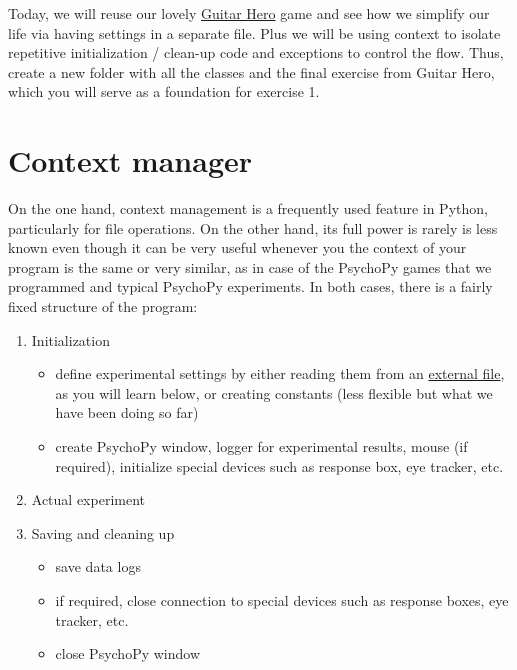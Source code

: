 \documentclass[
]{book}
\providecommand{\tightlist}{%
  \setlength{\itemsep}{0pt}\setlength{\parskip}{0pt}}
\begin{document}
Today, we will reuse our lovely \protect\hyperlink{seminar-02-06}{Guitar Hero} game and see how we simplify our life via having settings in a separate file. Plus we will be using context to isolate repetitive initialization / clean-up code and exceptions to control the flow. Thus, create a new folder with all the classes and the final exercise from Guitar Hero, which you will serve as a foundation for exercise 1.

\hypertarget{context-manager}{%
\section{Context manager}\label{context-manager}}

On the one hand, context management is a frequently used feature in Python, particularly for file operations. On the other hand, its full power is rarely is less known even though it can be very useful whenever you the context of your program is the same or very similar, as in case of the PsychoPy games that we programmed and typical PsychoPy experiments. In both cases, there is a fairly fixed structure of the program:

\begin{enumerate}
\def\labelenumi{\arabic{enumi}.}
\tightlist
\item
  Initialization

  \begin{itemize}
  \tightlist
  \item
    define experimental settings by either reading them from an \protect\hyperlink{settings-files}{external file}, as you will learn below, or creating constants (less flexible but what we have been doing so far)
  \item
    create PsychoPy window, logger for experimental results, mouse (if required), initialize special devices such as response box, eye tracker, etc.
  \end{itemize}
\item
  Actual experiment
\item
  Saving and cleaning up

  \begin{itemize}
  \tightlist
  \item
    save data logs
  \item
    if required, close connection to special devices such as response boxes, eye tracker, etc.
  \item
    close PsychoPy window
  \end{itemize}
\end{enumerate}
\end{document}
